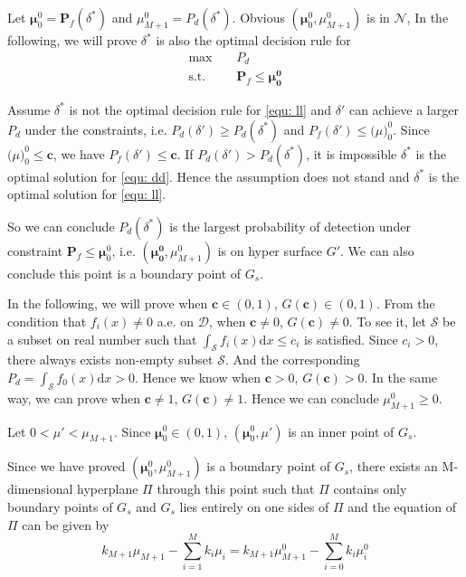 \documentclass[12pt,journal,a4paper,twoside,onecolumn]{IEEEtran}
\begin{document}
\begin{spacing}{2.5}
Let $\boldsymbol{\mu}_0^0 = \mathbf{P}_f(\delta^\ast)$ and $\mu_{M+1}^0 = P_d(\delta^\ast)$. Obvious $(\boldsymbol{\mu}_0^0, \mu_{M+1}^0)$ is in $\mathcal{N}$, In the following, we will prove  $\delta^\ast$ is also the optimal decision rule for 
\begin{equation}
\begin{split}
\label{equ: ll}
\max\;\;\;\;&P_d\\
\text{s.t.}\;\;\;\;&\mathbf{P}_f \leq \boldsymbol{\mu^0_0}
\end{split}
\end{equation}

Assume $\delta^\ast$ is not the optimal decision rule for \eqref{equ: ll} and $\delta'$ can achieve a larger $P_d$ under the constraints, i.e. $P_d(\delta') \geq P_d(\delta^\ast)$ and $P_f(\delta') \leq \boldsymbol(\mu)^0_0$. Since $\boldsymbol(\mu)^0_0 \leq \mathbf{c}$, we have $P_f(\delta') \leq \mathbf{c}$. If $P_d(\delta') > P_d(\delta^\ast)$, it is impossible $\delta^\ast$  is the optimal solution for \eqref{equ: dd}. Hence the assumption does not stand and $\delta^\ast$ is the optimal solution for \eqref{equ: ll}.

So we can conclude $P_d(\delta^\ast)$ is the largest probability of detection under constraint $\mathbf{P}_f \leq \boldsymbol{\mu}^0_0$, i.e.
$(\mathbf{\mu^0_0}, \mu_{M+1}^0)$ is on hyper surface $G'$. We can also conclude this point  is a boundary point of $G_s$. 

In the following, we will prove when $\mathbf{c} \in (0, 1)$, $G(\mathbf{c}) \in (0, 1)$.
From the condition that $f_i(x) \neq 0$ a.e. on $\mathcal{D}$, when $\mathbf{c} \neq 0$,  $G(\mathbf{c}) \neq 0$. To see it, let $\mathcal{S}$ be a subset on real number such that $\int_{\mathcal{S}} f_i(x)\mathrm{d}x \leq c_i$ is satisfied. Since $c_i > 0$, there always exists non-empty subset $\mathcal{S}$. And the corresponding $P_d = \int_{\mathcal{S}}f_0(x)\mathrm{d}x >0$. Hence we know when $\mathbf{c} > 0$, $G(\mathbf{c}) > 0$. In the same way, we can prove when $\mathbf{c} \neq 1$, $G(\mathbf{c}) \neq 1$.   
Hence we can conclude $\mu_{M+1}^0 \geq 0$.

Let $0 < \mu' < \mu_{M+1}$. Since $\boldsymbol{\mu}^0_0 \in (0, 1)$,  $(\boldsymbol{\mu}_0^0, \mu')$ is an inner point of $G_s$. 

Since we have proved $(\boldsymbol{\mu}^0_0, \mu_{M+1}^0)$ is a boundary point of $G_s$, there exists an M-dimensional hyperplane $\Pi$ through this point such that $\Pi$ contains only boundary points of $G_s$ and $G_s$ lies entirely on one sides of $\Pi$  \cite{dantzig1951fundamental,  LehmannTest} and the equation of $\Pi$ can be given by 
\[
k_{M+1}\mu_{M+1} - \sum_{i=1}^{M}k_i\mu_i = k_{M+1}\mu_{M+1}^0 - \sum_{i=0}^{M}k_i\mu_i^0
\]


\end{spacing}
\end{document}
